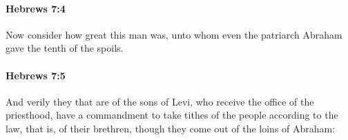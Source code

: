 		\paragraph{Hebrews 7:4} %
			\label{HEBREWS-7-4}

			Now consider how great this man was, unto whom even the patriarch Abraham gave the tenth of the spoils.

			\begin{framed}
			\scriptsize
				\begin{compactdesc}
					\item[SBLG] 
				\end{compactdesc}
			\end{framed}

		\paragraph{Hebrews 7:5} %
			\label{HEBREWS-7-5}

			And verily they that are of the sons of Levi, who receive the office of the priesthood, have a commandment to take tithes of the people according to the law, that is, of their brethren, though they come out of the loins of Abraham:

